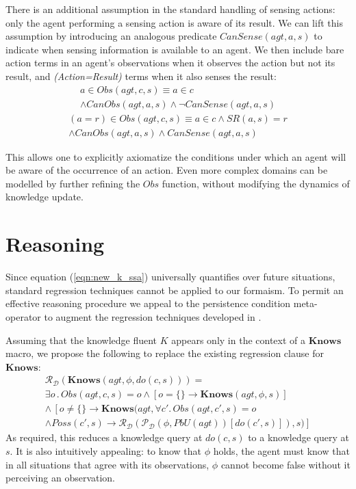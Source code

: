 \documentclass{ifaamas-submission}
\begin{document}
There is an additional assumption in the standard handling of sensing
actions: only the agent performing a sensing action is aware of its
result. We can lift this assumption by introducing an analogous
predicate $CanSense(agt,a,s)$ to indicate when sensing information
is available to an agent. We then include bare action terms in an
agent's observations when it observes the action but not its result,
and \emph{(Action=Result)} terms when it also senses the result:
\begin{multline*}
a\in Obs(agt,c,s)\equiv a\in c\\
\wedge CanObs(agt,a,s)\wedge\neg CanSense(agt,a,s)\end{multline*}
\begin{multline*}
(a=r)\in Obs(agt,c,s)\equiv a\in c\wedge SR(a,s)=r\\
\wedge CanObs(agt,a,s)\wedge CanSense(agt,a,s)
\end{multline*}

This allows one to explicitly axiomatize the conditions under which an agent
will be aware of the occurrence of an action. Even more complex domains can
be modelled by further refining the $Obs$ function, without modifying the
dynamics of knowledge update.

\section{Reasoning}

\label{sec:Reasoning}

Since equation (\ref{eqn:new_k_ssa}) universally quantifies over future
situations, standard regression techniques cannot be applied to our formaism.
To permit an effective reasoning procedure
we appeal to the persistence condition meta-operator \cite{kelly07sc_persistence} to augment the regression techniques developed in 
\cite{scherl03sc_knowledge}.

Assuming that the knowledge fluent $K$ appears only in the context
of a $\mathbf{Knows}$ macro, we propose the following to replace
the existing regression clause for $\mathbf{Knows}$:
\begin{multline}
\mathcal{R}_{\mathcal{D}}(\mathbf{Knows}(agt,\phi,do(c,s)))=\\
\exists o\,.\, Obs(agt,c,s)=o
\wedge\left[o=\{\}\rightarrow\mathbf{Knows}(agt,\phi,s)\right]\\
\wedge\,\left[o\neq\{\}\rightarrow\mathbf{Knows}(agt,\forall c'.\, Obs(agt,c',s)=o\right.\\
\left.\wedge Poss(c',s)\rightarrow\mathcal{R}_{\mathcal{D}}(\mathcal{P}_{\mathcal{D}}(\phi,PbU(agt))[do(c',s)]),s)\right]\label{eqn:R_do_c_s}
\end{multline}
As required, this reduces a knowledge query at $do(c,s)$ to a knowledge
query at $s$. It is also intuitively appealing: to know that $\phi$
holds, the agent must know that in all situations that agree with
its observations, $\phi$ cannot become false without it perceiving an
observation.
\end{document}
